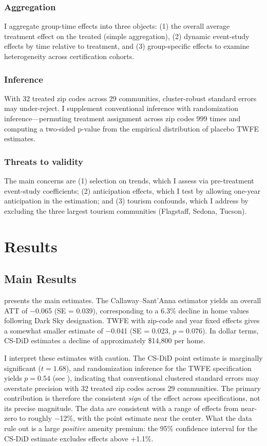 \documentclass[12pt]{article}
\begin{document}
\subsubsection*{Aggregation} I aggregate group-time effects into three objects: (1) the overall average treatment effect on the treated (simple aggregation), (2) dynamic event-study effects by time relative to treatment, and (3) group-specific effects to examine heterogeneity across certification cohorts.

\subsubsection*{Inference} With 32 treated zip codes across 29 communities, cluster-robust standard errors may under-reject. I supplement conventional inference with randomization inference---permuting treatment assignment across zip codes 999 times and computing a two-sided p-value from the empirical distribution of placebo TWFE estimates.

\subsubsection*{Threats to validity} The main concerns are (1) selection on trends, which I assess via pre-treatment event-study coefficients; (2) anticipation effects, which I test by allowing one-year anticipation in the estimation; and (3) tourism confounds, which I address by excluding the three largest tourism communities (Flagstaff, Sedona, Tucson).

\section{Results}

\subsection{Main Results}



 presents the main estimates. The Callaway--Sant'Anna estimator yields an overall ATT of $-$0.065 (SE = 0.039), corresponding to a 6.3\% decline in home values following Dark Sky designation. TWFE with zip-code and year fixed effects gives a somewhat smaller estimate of $-$0.041 (SE = 0.023, $p = 0.076$). In dollar terms, CS-DiD estimates a decline of approximately \$14{,}800 per home.

I interpret these estimates with caution. The CS-DiD point estimate is marginally significant ($t = 1.68$), and randomization inference for the TWFE specification yields $p = 0.54$ (see ), indicating that conventional clustered standard errors may overstate precision with 32 treated zip codes across 29 communities. The primary contribution is therefore the consistent \textit{sign} of the effect across specifications, not its precise magnitude. The data are consistent with a range of effects from near-zero to roughly $-$12\%, with the point estimate near the center. What the data rule out is a large \textit{positive} amenity premium: the 95\% confidence interval for the CS-DiD estimate excludes effects above +1.1\%.
\end{document}

